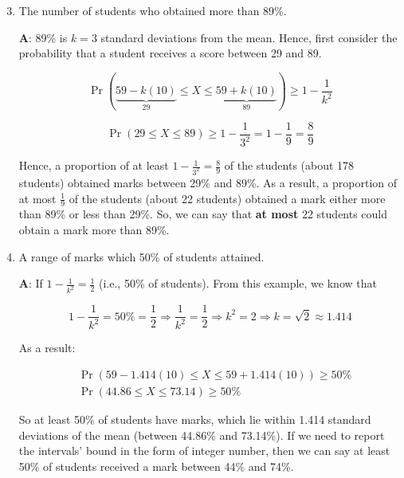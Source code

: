 \documentclass[
  ignorenonframetext,
  aspectratio=43,
]{beamer}
\let\olditem\item
\renewcommand\item{\olditem\justifying}
\begin{document}
\begin{frame}{}
\protect\hypertarget{section-9}{}
\begin{enumerate}
\setcounter{enumi}{2}
\item
  The number of students who obtained more than 89\%.

  \textbf{A}: 89\% is \(k = 3\) standard deviations from the mean.
  Hence, first consider the probability that a student receives a score
  between 29 and 89. \vspace{-7pt}

  \[
   \Pr(\underbrace{59 - k(10)}_{29} \le X \le \underbrace{59 + k(10)}_{89}) \ge 1 - \frac{1}{k^2}
   \]

  \[
   \Pr(29 \le X \le 89) \ge 1 - \frac{1}{3^2} = 1 - \frac{1}{9} = \frac{8}{9}
   \]

  Hence, a proportion of at least \(1 - \frac{1}{3^2} = \frac{8}{9}\) of
  the students (about 178 students) obtained marks between 29\% and
  89\%. As a result, a proportion of at most \(\frac{1}{9}\) of the
  students (about 22 students) obtained a mark either more than 89\% or
  less than 29\%. So, we can say that \textbf{at most} 22 students could
  obtain a mark more than 89\%.
\end{enumerate}
\end{frame}

\begin{frame}{}
\protect\hypertarget{section-10}{}
\begin{enumerate}
\setcounter{enumi}{3}
\item
  A range of marks which 50\% of students attained.

  \textbf{A}: If \(1 - \frac{1}{k^2} = \frac{1}{2}\) (i.e., 50\% of
  students). From this example, we know that \vspace{-15pt}

  \[
   1 - \frac{1}{k^2} = 50\% = \frac{1}{2}
   \Rightarrow \frac{1}{k^2} = \frac{1}{2}
   \Rightarrow k^2 = 2
   \Rightarrow k = \sqrt{2} \approx 1.414
   \]

  As a result: \vspace{-5pt}

  \[
   \begin{aligned}
   & \Pr(59 - 1.414(10) \le X \le 59 + 1.414(10)) \ge 50\% \\
   & \Pr(44.86 \le X \le 73.14) \ge 50\%
   \end{aligned}
   \]

  So at least 50\% of students have marks, which lie within 1.414
  standard deviations of the mean (between 44.86\% and 73.14\%). If we
  need to report the intervals' bound in the form of integer number,
  then we can say at least 50\% of students received a mark between 44\%
  and 74\%.
\end{enumerate}
\end{frame}
\end{document}
